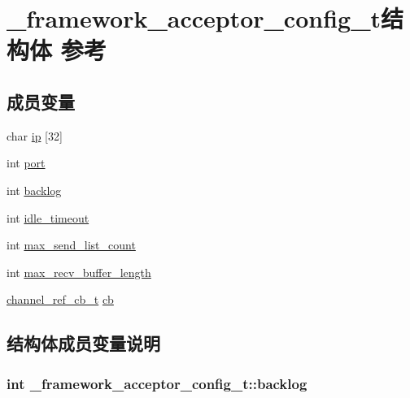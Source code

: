 \hypertarget{a00009}{}\section{\+\_\+framework\+\_\+acceptor\+\_\+config\+\_\+t结构体 参考}
\label{a00009}
\subsection*{成员变量}
\begin{DoxyCompactItemize}
\item 
char \hyperlink{a00009_a388d21431810f251c1e84a2512e3792e_a388d21431810f251c1e84a2512e3792e}{ip} \mbox{[}32\mbox{]}
\item 
int \hyperlink{a00009_a3f5aeae2ed8ad6ecb4e319b49c40d410_a3f5aeae2ed8ad6ecb4e319b49c40d410}{port}
\item 
int \hyperlink{a00009_a69e206c433c56e84a582531372fdf4ee_a69e206c433c56e84a582531372fdf4ee}{backlog}
\item 
int \hyperlink{a00009_acb4b5f93bbb16f752aa5e88075aae5ad_acb4b5f93bbb16f752aa5e88075aae5ad}{idle\+\_\+timeout}
\item 
int \hyperlink{a00009_a7e11f475833e8b10f232ce7d9e0f6589_a7e11f475833e8b10f232ce7d9e0f6589}{max\+\_\+send\+\_\+list\+\_\+count}
\item 
int \hyperlink{a00009_a74d3ca42b906826b9acc1b031b6b4510_a74d3ca42b906826b9acc1b031b6b4510}{max\+\_\+recv\+\_\+buffer\+\_\+length}
\item 
\hyperlink{a00050_ae296ec4d1ce108960de8dcc423956a1d_ae296ec4d1ce108960de8dcc423956a1d}{channel\+\_\+ref\+\_\+cb\+\_\+t} \hyperlink{a00009_a0fb53c4929a16e474d1de6eb99d41473_a0fb53c4929a16e474d1de6eb99d41473}{cb}
\end{DoxyCompactItemize}


\subsection{结构体成员变量说明}
\hypertarget{a00009_a69e206c433c56e84a582531372fdf4ee_a69e206c433c56e84a582531372fdf4ee}{}
\subsubsection[{backlog}]{\setlength{\rightskip}{0pt plus 5cm}int \+\_\+framework\+\_\+acceptor\+\_\+config\+\_\+t\+::backlog}\label{a00009_a69e206c433c56e84a582531372fdf4ee_a69e206c433c56e84a582531372fdf4ee}
\hypertarget{a00009_a0fb53c4929a16e474d1de6eb99d41473_a0fb53c4929a16e474d1de6eb99d41473}{}
